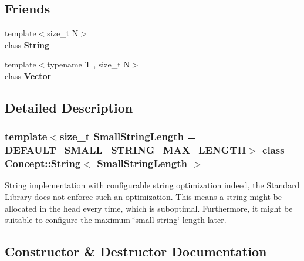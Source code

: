 \subsection*{Friends}
\begin{DoxyCompactItemize}
\item 
\mbox{\label{class_concept_1_1_string_a85b1ec1d0e12259a2b45fe75778c01bc}} 
{\footnotesize template$<$size\+\_\+t N$>$ }\\class {\bfseries String}
\item 
\mbox{\label{class_concept_1_1_string_ac14c06b74acbf135ede85924e7b3d521}} 
{\footnotesize template$<$typename T , size\+\_\+t N$>$ }\\class {\bfseries Vector}
\end{DoxyCompactItemize}


\subsection{Detailed Description}
\subsubsection*{template$<$size\+\_\+t Small\+String\+Length = D\+E\+F\+A\+U\+L\+T\+\_\+\+S\+M\+A\+L\+L\+\_\+\+S\+T\+R\+I\+N\+G\+\_\+\+M\+A\+X\+\_\+\+L\+E\+N\+G\+TH$>$\newline
class Concept\+::\+String$<$ Small\+String\+Length $>$}

\mbox{\hyperlink{class_concept_1_1_string}{String}} implementation with configurable string optimization indeed, the Standard Library does not enforce such an optimization. This means a string might be allocated in the head every time, which is suboptimal. Furthermore, it might be suitable to configure the maximum \char`\"{}small string\char`\"{} length later. 

\subsection{Constructor \& Destructor Documentation}
\mbox{\label{class_concept_1_1_string_a65640f64bade4d9d3295adfadaee897c}} 
